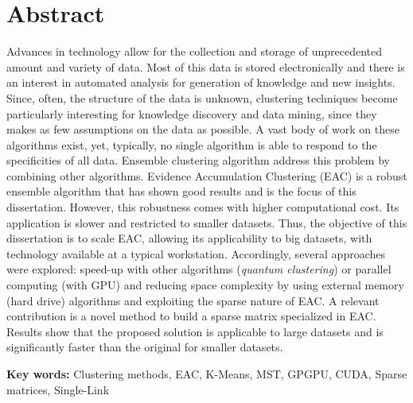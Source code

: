
\section*{Abstract}


Advances in technology allow for the collection and storage of unprecedented amount and variety of data.
Most of this data is stored electronically and there is an interest in automated analysis for generation of knowledge and new insights.
Since, often, the structure of the data is unknown, clustering techniques become particularly interesting for knowledge discovery and data mining, since they makes as few assumptions on the data as possible.
A vast body of work on these algorithms exist, yet, typically, no single algorithm is able to respond to the specificities of all data.
Ensemble clustering algorithm address this problem by combining other algorithms.
Evidence Accumulation Clustering (EAC) is a robust ensemble algorithm that has shown good results and is the focus of this dissertation.
However, this robustness comes with higher computational cost.
Its application is slower and restricted to smaller datasets.
Thus, the objective of this dissertation is to scale EAC, allowing its applicability to big datasets, with technology available at a typical workstation.
Accordingly, several approaches were explored: speed-up with other algorithms (\emph{quantum clustering}) or parallel computing (with GPU) and reducing space complexity by using external memory (hard drive) algorithms and exploiting the sparse nature of EAC.
A relevant contribution is a novel method to build a sparse matrix specialized in EAC.
Results show that the proposed solution is applicable to large datasets and is significantly faster than the original for smaller datasets.

\vfill

\textbf{\Large Key words:} Clustering methods, EAC, K-Means, MST, GPGPU, CUDA, Sparse matrices, Single-Link

\cleardoublepage

